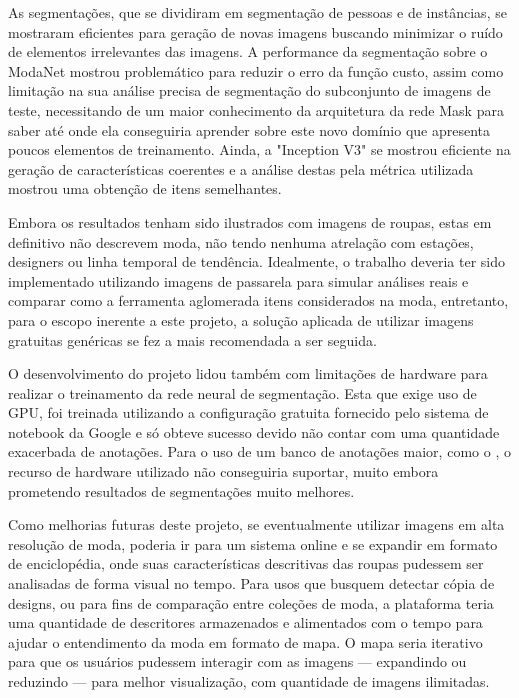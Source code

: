 \documentclass[12pt]{report}
\begin{document}
As segmentações, que se dividiram em segmentação de pessoas e de instâncias, se mostraram eficientes para geração de novas imagens buscando minimizar o ruído de elementos irrelevantes das imagens. A performance da segmentação sobre o ModaNet mostrou problemático para reduzir o erro da função custo, assim como limitação na sua análise precisa de segmentação do subconjunto de imagens de teste, necessitando de um maior conhecimento da arquitetura da rede Mask para saber até onde ela conseguiria aprender sobre este novo domínio que apresenta poucos elementos de treinamento. Ainda, a "Inception V3" se mostrou eficiente na geração de características coerentes e a análise destas pela métrica utilizada mostrou uma obtenção de itens semelhantes.

Embora os resultados tenham sido ilustrados com imagens de roupas, estas em definitivo não descrevem moda, não tendo nenhuma atrelação com estações, designers ou linha temporal de tendência. Idealmente, o trabalho deveria ter sido implementado utilizando imagens de passarela para simular análises reais e comparar como a ferramenta aglomerada itens considerados na moda, entretanto, para o escopo inerente a este projeto, a solução aplicada de utilizar imagens gratuitas genéricas se fez a mais recomendada a ser seguida. 

O desenvolvimento do projeto lidou também com limitações de hardware para realizar o treinamento da rede neural de segmentação. Esta que exige uso de GPU, foi treinada utilizando a configuração gratuita fornecido pelo sistema de notebook da Google e só obteve sucesso devido não contar com uma quantidade exacerbada de anotações. Para o uso de um banco de anotações maior, como o \cite{deepfashion2}, o recurso de hardware utilizado não conseguiria suportar, muito embora prometendo resultados de segmentações muito melhores.

Como melhorias futuras deste projeto, se eventualmente utilizar imagens em alta resolução de moda, poderia ir para um sistema online e se expandir em formato de enciclopédia, onde suas características descritivas das roupas pudessem ser analisadas de forma visual no tempo. Para usos que busquem detectar cópia de designs, ou para fins de comparação entre coleções de moda, a plataforma teria uma quantidade de descritores armazenados e alimentados com o tempo para ajudar o entendimento da moda em formato de mapa. O mapa seria iterativo para que os usuários pudessem interagir com as imagens --- expandindo ou reduzindo --- para melhor visualização, com quantidade de imagens ilimitadas.  
\end{document}
